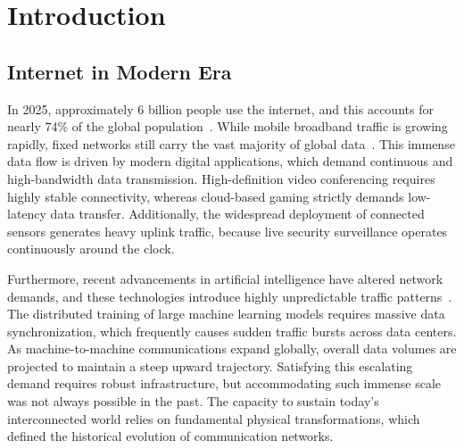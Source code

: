 \documentclass[12pt, a4paper, twoside, openright]{report}
\begin{document}
\clearpage

\chapter{Introduction}
\section{Internet in Modern Era}
In 2025, approximately 6 billion people use the internet, and this accounts for nearly 74\% of the global population~\cite{ituInternetUse}. While mobile broadband traffic is growing rapidly, fixed networks still carry the vast majority of global data~\cite{ituInternetTraffic}. This immense data flow is driven by modern digital applications, which demand continuous and high-bandwidth data transmission. High-definition video conferencing requires highly stable connectivity, whereas cloud-based gaming strictly demands low-latency data transfer. Additionally, the widespread deployment of connected sensors generates heavy uplink traffic, because live security surveillance operates continuously around the clock.

Furthermore, recent advancements in artificial intelligence have altered network demands, and these technologies introduce highly unpredictable traffic patterns~\cite{nokiaProjection}. The distributed training of large machine learning models requires massive data synchronization, which frequently causes sudden traffic bursts across data centers. As machine-to-machine communications expand globally, overall data volumes are projected to maintain a steep upward trajectory. Satisfying this escalating demand requires robust infrastructure, but accommodating such immense scale was not always possible in the past. The capacity to sustain today's interconnected world relies on fundamental physical transformations, which defined the historical evolution of communication networks.
\end{document}
